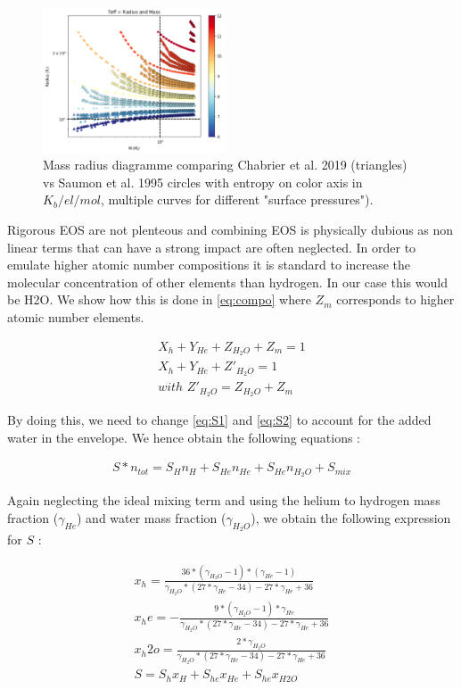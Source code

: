 \begin{figure}
    \centering
    \includegraphics[width=0.48\textwidth]{Images/M-R_benchmark.png}
    \caption{Mass radius diagramme comparing Chabrier et al. 2019 (triangles) vs Saumon et al. 1995 circles with entropy on color axis in $K_b/el/mol$, multiple curves for different "surface pressures").}
    \label{fig:M-R_benchmark}
\end{figure}

Rigorous EOS are not plenteous and combining EOS is physically dubious as non linear terms that can have a strong impact are often neglected. In order to emulate higher atomic number compositions it is standard to increase the molecular concentration of other elements than hydrogen. In our case this would be H2O. We show how this is done in \cref{eq:compo} where $Z_m$ corresponds to higher atomic number elements.

\begin{align}
    \label{eq:compo}
    X_h + Y_{He} + Z_{H_2O} + Z_m = 1 \nonumber \\
    X_h + Y_{He} + Z'_{H_2O} = 1 \\ 
    with \,\,  Z'_{H_2O} = Z_{H_2O} + Z_m \nonumber 
\end{align}

By doing this, we need to change \cref{eq:S1} and \cref{eq:S2} to account for the added water in the envelope. We hence obtain the following equations :

\begin{align}
    S*n_{tot} = S_{H}n_{H} + S_{He}n_{He} + S_{He}n_{H_2O} + S_{mix}\label{eq:S3}
\end{align}

Again neglecting the ideal mixing term and using the helium to hydrogen mass fraction ($\gamma_{He}$) and water mass fraction ($\gamma_{H_2O}$), we obtain the following expression for $S$ :

\begin{align}
    x_h = \frac{36*(\gamma_{H_2O}-1)*(\gamma_{He}-1)}{\gamma_{H_2O}*(27*\gamma_{He}-34)-27*\gamma_{He}+36} \nonumber \\
    x_he = -\frac{9*(\gamma_{H_2O}-1)*\gamma_{He}}{\gamma_{H_2O}*(27*\gamma_{He}-34)-27*\gamma_{He}+36} \nonumber \\
    x_h2o = \frac{2*\gamma_{H_2O}}{\gamma_{H_2O}*(27*\gamma_{He}-34)-27*\gamma_{He}+36} \nonumber \\
    S = S_{h}x_{H} + S_{he}x_{He} + S_{he}x_{H2O} \label{eq:S4}
\end{align}


